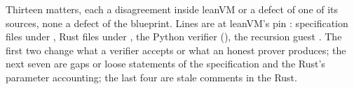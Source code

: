 \label{sec:gen-report-upstream}

\begin{sloppypar}
Thirteen matters, each a disagreement inside leanVM or a defect of one of its sources, none a
defect of the blueprint. Lines are at leanVM's pin : specification files under
, Rust files under , the Python verifier
 (), the recursion guest
. The first two change what a verifier accepts
or what an honest prover produces; the next seven are gaps or loose statements of the
specification and the Rust's parameter accounting; the last four are stale comments in the Rust.
\end{sloppypar}

